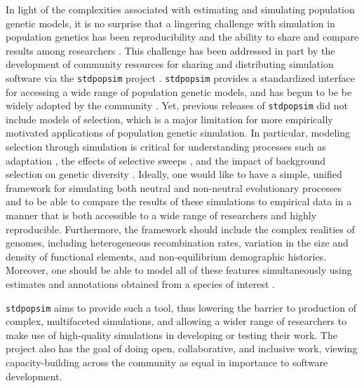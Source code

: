 \documentclass[hidelinks]{article}
\newcommand{\stdpopsim}{\texttt{stdpopsim}\xspace}
\begin{document}
    In light of the complexities associated with estimating and simulating
    population genetic models, it is no surprise that
    a lingering challenge with simulation in population genetics has been
    reproducibility and the ability to share and compare results among 
    researchers \citep[e.g.,][]{ragsdale2020lessons}.
    This challenge has been addressed in part by the development
    of community resources for sharing and distributing simulation software
    via the \stdpopsim project \citep{adrion2020community}. \stdpopsim
    provides a standardized interface for accessing a wide range of
    population genetic models, and has begun to be be widely adopted by the community 
    \citep[e.g.,][]{speidel2021inferring, wang2021automatic, yang2022trustgwas, degiorgio2022spatially, browning2023fast, schweiger2023ultrafast, temple2024modeling, haag2025pandora}.
    Yet, previous releases of \stdpopsim did not include
    models of selection, which is a major limitation for more empirically motivated
    applications of population genetic simulation. In particular, modeling selection
    through simulation is critical for understanding processes such
    as adaptation \citep[e.g.][]{thornton2019polygenic,hartfield2024polygenic}, the effects of selective sweeps 
    \citep[e.g.][]{braverman1995hitchhiking,fay2000hitchhiking,przeworski2002signature,przeworski2005signature,schrider2015soft}, 
    and the impact of background selection on genetic diversity
    \citep[e.g.][]{charlesworth1993effect,charlesworth1995pattern,williamson2002genealogy,ewing2016consequences,torres2020temporal}.
    Ideally, one would like
    to have a simple, unified framework for simulating both neutral and
    non-neutral evolutionary processes and to be able to compare the
    results of these simulations to empirical data in a manner that is
    both accessible to a wide range of researchers and highly reproducible. 
    Furthermore, the framework should include the complex realities of 
    genomes, including heterogeneous recombination rates, 
    variation in the size and density of functional elements, and
    non-equilibrium demographic histories. Moreover, one should be able
    to model all of these features simultaneously using estimates and annotations obtained
    from a species of interest \citep[e.g.][]{schrider2020background,rodrigues2024shared}.

    \stdpopsim{} aims to provide such a tool,
    thus lowering the barrier to production of complex, multifaceted simulations,
    and allowing a wider range of researchers to make use of high-quality simulations
    in developing or testing their work.
    The project also has the goal of doing open, collaborative, and inclusive work,
    viewing capacity-building across the community as equal in importance to software development.
\end{document}
